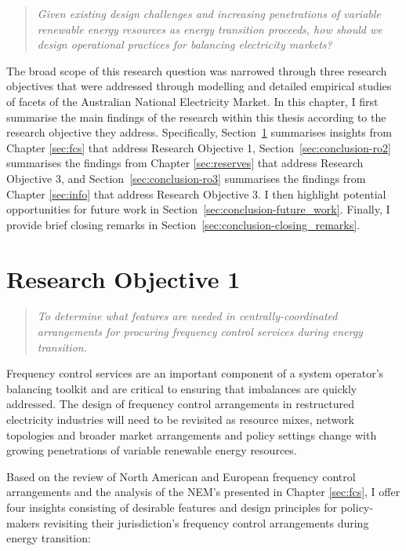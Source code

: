 \documentclass[12pt,a4paper,]{report}
\begin{document}
\begin{quote}
\emph{Given existing design challenges and increasing penetrations of
variable renewable energy resources as energy transition proceeds, how
should we design operational practices for balancing electricity
markets?}
\end{quote}

The broad scope of this research question was narrowed through three
research objectives that were addressed through modelling and detailed
empirical studies of facets of the Australian National Electricity
Market. In this chapter, I first summarise the main findings of the
research within this thesis according to the research objective they
address. Specifically, Section~\ref{sec:conclusion-ro1} summarises
insights from Chapter \ref{sec:fcs} that address Research Objective 1,
Section~\ref{sec:conclusion-ro2} summarises the findings from Chapter
\ref{sec:reserves} that address Research Objective 3, and
Section~\ref{sec:conclusion-ro3} summarises the findings from Chapter
\ref{sec:info} that address Research Objective 3. I then highlight
potential opportunities for future work in
Section~\ref{sec:conclusion-future_work}. Finally, I provide brief
closing remarks in Section~\ref{sec:conclusion-closing_remarks}.

\hypertarget{sec:conclusion-ro1}{%
\section{Research Objective 1}\label{sec:conclusion-ro1}}

\begin{quote}
\emph{To determine what features are needed in centrally-coordinated
arrangements for procuring frequency control services during energy
transition.}
\end{quote}

Frequency control services are an important component of a system
operator's balancing toolkit and are critical to ensuring that
imbalances are quickly addressed. The design of frequency control
arrangements in restructured electricity industries will need to be
revisited as resource mixes, network topologies and broader market
arrangements and policy settings change with growing penetrations of
variable renewable energy resources.

Based on the review of North American and European frequency control
arrangements and the analysis of the NEM's presented in Chapter
\ref{sec:fcs}, I offer four insights consisting of desirable features
and design principles for policy-makers revisiting their jurisdiction's
frequency control arrangements during energy transition:
\end{document}
